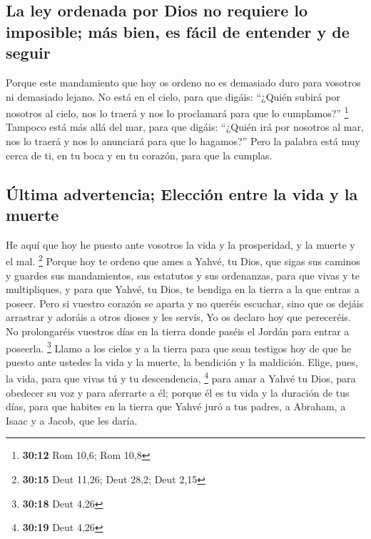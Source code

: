 \hypertarget{la-ley-ordenada-por-dios-no-requiere-lo-imposible-muxe1s-bien-es-fuxe1cil-de-entender-y-de-seguir}{%
\subsection{La ley ordenada por Dios no requiere lo imposible; más bien,
es fácil de entender y de
seguir}\label{la-ley-ordenada-por-dios-no-requiere-lo-imposible-muxe1s-bien-es-fuxe1cil-de-entender-y-de-seguir}}

 Porque este mandamiento que hoy os ordeno no es
demasiado duro para vosotros ni demasiado lejano.  No
está en el cielo, para que digáis: ``¿Quién subirá por nosotros al
cielo, nos lo traerá y nos lo proclamará para que lo cumplamos?''
\footnote{\textbf{30:12} Rom 10,6; Rom 10,8}  Tampoco
está más allá del mar, para que digáis: ``¿Quién irá por nosotros al
mar, nos lo traerá y nos lo anunciará para que lo hagamos?''
 Pero la palabra está muy cerca de ti, en tu boca y en tu
corazón, para que la cumplas.

\hypertarget{uxfaltima-advertencia-elecciuxf3n-entre-la-vida-y-la-muerte}{%
\subsection{Última advertencia; Elección entre la vida y la
muerte}\label{uxfaltima-advertencia-elecciuxf3n-entre-la-vida-y-la-muerte}}

 He aquí que hoy he puesto ante vosotros la vida y la
prosperidad, y la muerte y el mal. \footnote{\textbf{30:15} Deut 11,26;
  Deut 28,2; Deut 2,15}  Porque hoy te ordeno que ames a
Yahvé, tu Dios, que sigas sus caminos y guardes sus mandamientos, sus
estatutos y sus ordenanzas, para que vivas y te multipliques, y para que
Yahvé, tu Dios, te bendiga en la tierra a la que entras a poseer.
 Pero si vuestro corazón se aparta y no queréis escuchar,
sino que os dejáis arrastrar y adoráis a otros dioses y les servís,
 Yo os declaro hoy que pereceréis. No prolongaréis
vuestros días en la tierra donde paséis el Jordán para entrar a
poseerla. \footnote{\textbf{30:18} Deut 4,26}  Llamo a
los cielos y a la tierra para que sean testigos hoy de que he puesto
ante ustedes la vida y la muerte, la bendición y la maldición. Elige,
pues, la vida, para que vivas tú y tu descendencia, \footnote{\textbf{30:19}
  Deut 4,26}  para amar a Yahvé tu Dios, para obedecer su
voz y para aferrarte a él; porque él es tu vida y la duración de tus
días, para que habites en la tierra que Yahvé juró a tus padres, a
Abraham, a Isaac y a Jacob, que les daría.

